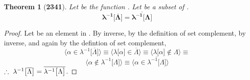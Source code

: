 \documentclass[preview]{standalone}
\newtheorem*{theorem*}{Theorem}
\begin{document}
\begin{theorem*}[\textbf{2341}]
    Let \bm{$\lambda$} be the function 
    . 
    Let \bm{$\Lambda$} be a subset of . 
    \begin{equation*}
        \bm{
        \lambda ^{-1} \big[ \overline{\Lambda} \big] 
            = 
        \overline{ \lambda ^{-1} \big[ \Lambda \big]}
        }
    \end{equation*}
\end{theorem*}

\begin{proof}
    Let \bm{$\alpha$} be an element in 
    .
    By  inverse, by the definition of set complement,
    by \bm{$\lambda$} inverse, and again by the defintion of set complement,
    \begin{equation*}
        \Big \langle
            \alpha \in \lambda ^{-1} \big[ \overline{\Lambda} \big]
        \Big \rangle
            \equiv
        \Big \langle
            \lambda \big[ \alpha \big] \in \overline{\Lambda}
        \Big \rangle
            \equiv
        \Big \langle
            \lambda \big[ \alpha \big] \notin \Lambda
        \Big \rangle
            \equiv
    \end{equation*}
    \begin{equation*}
        \Big \langle 
            \alpha 
                \notin 
            \lambda ^{-1} \big[ \Lambda \big]
        \Big \rangle
            \equiv
        \Big \langle
            \alpha 
                \in
            \overline{
                \lambda ^{-1} \big[ \Lambda \big]
            }
        \Big \rangle
    \end{equation*}
    $\therefore \text{\space} \relax{
        \lambda ^{-1} \big[ \overline{\Lambda} \big] 
            = 
        \overline{ \lambda ^{-1} \big[ \Lambda \big]}
    }$.
\color{lightgray} \end{proof}
\end{document}
